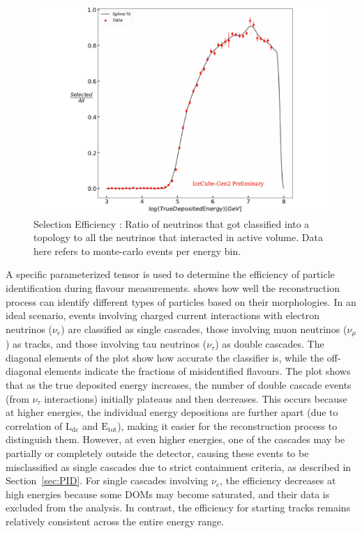 \begin{figure}[h!]
    \centering
      \includegraphics{./figures/gen2/SelectionEff.pdf}
      \caption{Selection Efficiency : Ratio of neutrinos that got classified into a topology to all the neutrinos that interacted in active volume. Data here refers to monte-carlo events per energy bin.}
  \end{figure}


A specific parameterized tensor is used to determine the efficiency of particle identification during flavour measurements.  shows how well the reconstruction process can identify different types of particles based on their morphologies. In an ideal scenario, events involving charged current interactions with electron neutrinos ($\nu_e$) are classified as single cascades, those involving muon neutrinos ($\nu_{\mu}$) as tracks, and those involving tau neutrinos ($\nu_{\tau}$) as double cascades. The diagonal elements of the plot show how accurate the classifier is, while the off-diagonal elements indicate the fractions of misidentified flavours. The plot shows that as the true deposited energy increases, the number of double cascade events (from $\nu_{\tau}$ interactions) initially plateaus and then decreases. This occurs because at higher energies, the individual energy depositions are further apart (due to correlation of $\mathrm{L}_{\mathrm{dc}}$ and $\mathrm{E}_{\mathrm{tot}}$), making it easier for the reconstruction process to distinguish them. However, at even higher energies, one of the cascades may be partially or completely outside the detector, causing these events to be misclassified as single cascades due to strict containment criteria, as described in Section~\ref{sec:PID}. For single cascades involving $\nu_e$, the efficiency decreases at high energies because some DOMs may become saturated, and their data is excluded from the analysis. In contrast, the efficiency for starting tracks remains relatively consistent across the entire energy range.


